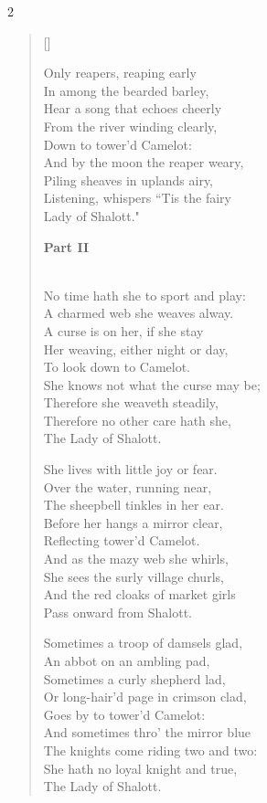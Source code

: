 \begin{paracol}{2}
\begin{verse}[\versewidth]
\begin{patverse}
Only reapers, reaping early\\
In among the bearded barley,\\
Hear a song that echoes cheerly\\
From the river winding clearly,\\
Down to tower'd Camelot:\\
And by the moon the reaper weary,\\
Piling sheaves in uplands airy,\\
Listening, whispers ``Tis the fairy\\
Lady of Shalott." \end{patverse}\switchcolumn

\textbf{Part II}
\begin{patverse}
\phantom{.}\\
No time hath she to sport and play:\\
A charmed web she weaves alway.\\
A curse is on her, if she stay\\
Her weaving, either night or day,\\
To look down to Camelot.\\
She knows not what the curse may be;\\
Therefore she weaveth steadily,\\
Therefore no other care hath she,\\
The Lady of Shalott.
\end{patverse}

\begin{patverse}
She lives with little joy or fear.\\
Over the water, running near,\\
The sheepbell tinkles in her ear.\\
Before her hangs a mirror clear,\\
Reflecting tower'd Camelot.\\
And as the mazy web she whirls,\\
She sees the surly village churls,\\
And the red cloaks of market girls\\
Pass onward from Shalott.
\end{patverse}

\begin{patverse}
Sometimes a troop of damsels glad,\\
An abbot on an ambling pad,\\
Sometimes a curly shepherd lad,\\
Or long-hair'd page in crimson clad,\\
Goes by to tower'd Camelot:\\
And sometimes thro' the mirror blue\\
The knights come riding two and two:\\
She hath no loyal knight and true,\\
The Lady of Shalott.
\end{patverse}


\end{verse}
\end{paracol}

